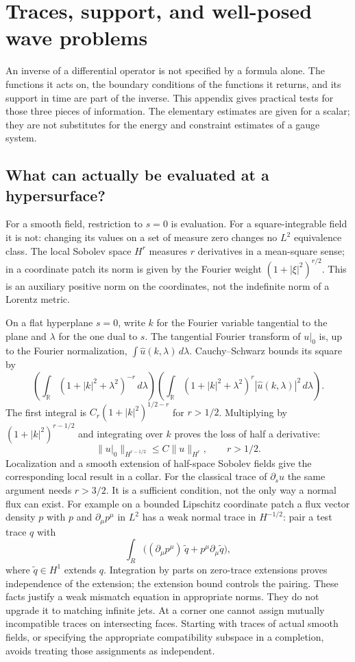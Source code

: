\chapter{Traces, support, and well-posed wave problems}\label{app:B}
An inverse of a differential operator is not specified by a formula alone. The functions it acts on, the boundary conditions of the functions it returns, and its support in time are part of the inverse. This appendix gives practical tests for those three pieces of information. The elementary estimates are given for a scalar; they are not substitutes for the energy and constraint estimates of a gauge system.

\section{What can actually be evaluated at a hypersurface?}
For a smooth field, restriction to $s=0$ is evaluation. For a square-integrable field it is not: changing its values on a set of measure zero changes no $L^2$ equivalence class. The local Sobolev space $H^r$ measures $r$ derivatives in a mean-square sense; in a coordinate patch its norm is given by the Fourier weight $(1+|\xi|^2)^{r/2}$. This is an auxiliary positive norm on the coordinates, not the indefinite norm of a Lorentz metric.

On a flat hyperplane $s=0$, write $k$ for the Fourier variable tangential to the plane and $\lambda$ for the one dual to $s$. The tangential Fourier transform of $u|_0$ is, up to the Fourier normalization, $\int \widehat u(k,\lambda)\,d\lambda$. Cauchy--Schwarz bounds its square by
\[
 \left(\int_{\mathbb R}(1+|k|^2+\lambda^2)^{-r}\,d\lambda\right)
 \left(\int_{\mathbb R}(1+|k|^2+\lambda^2)^r|\widehat u(k,\lambda)|^2\,d\lambda\right).
\]
The first integral is $C_r(1+|k|^2)^{1/2-r}$ for $r>1/2$. Multiplying by $(1+|k|^2)^{r-1/2}$ and integrating over $k$ proves the loss of half a derivative:
\[
 \|u|_0\|_{H^{r-1/2}}\leq C\|u\|_{H^r},\qquad r>1/2.
\]
Localization and a smooth extension of half-space Sobolev fields give the corresponding local result in a collar. For the classical trace of $\partial_s u$ the same argument needs $r>3/2$. It is a sufficient condition, not the only way a normal flux can exist. For example on a bounded Lipschitz coordinate patch a flux vector density $p$ with $p$ and $\partial_\mu p^\mu$ in $L^2$ has a weak normal trace in $H^{-1/2}$: pair a test trace $q$ with
\[
 \int_R \big((\partial_\mu p^\mu)\,\widetilde q+p^\mu\partial_\mu\widetilde q\big),
\]
where $\widetilde q\in H^1$ extends $q$. Integration by parts on zero-trace extensions proves independence of the extension; the extension bound controls the pairing. These facts justify a weak mismatch equation in appropriate norms. They do not upgrade it to matching infinite jets. At a corner one cannot assign mutually incompatible traces on intersecting faces. Starting with traces of actual smooth fields, or specifying the appropriate compatibility subspace in a completion, avoids treating those assignments as independent.

